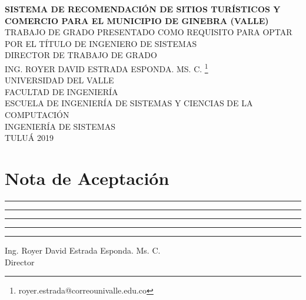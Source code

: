 \documentclass[12pt,letterpaper,openany]{book}
\begin{document}
\begin{titlepage}
\begin{center}
\textbf{SISTEMA DE RECOMENDACIÓN DE SITIOS TURÍSTICOS Y COMERCIO PARA EL MUNICIPIO DE GINEBRA (VALLE)} \\

\vspace*{1.3in}
TRABAJO DE GRADO PRESENTADO COMO REQUISITO PARA OPTAR POR EL TÍTULO DE INGENIERO DE SISTEMAS \\

\vspace*{1.3in}
DIRECTOR DE TRABAJO DE GRADO \\
ING. ROYER DAVID ESTRADA ESPONDA. MS. C. \footnote{royer.estrada@correounivalle.edu.co}\\

\vspace*{1.3in}
UNIVERSIDAD DEL VALLE\\
FACULTAD DE INGENIERÍA\\
ESCUELA DE INGENIERÍA DE SISTEMAS Y CIENCIAS DE LA COMPUTACIÓN\\
INGENIERÍA DE SISTEMAS\\
TULUÁ
2019

\end{center}
\thispagestyle{empty}
\end{titlepage}

\chapter*{Nota de Aceptación}
\vspace*{1in}
\begin{center}
\rule{90mm}{0.1mm} \newline
\rule{90mm}{0.1mm} \newline
\rule{90mm}{0.1mm} \newline
\rule{90mm}{0.1mm} \newline
\end{center}

\vspace*{1.5in}
\rule{90mm}{0.1mm} \newline
Ing. Royer David Estrada Esponda. Ms. C. \\
Director
\end{document}
